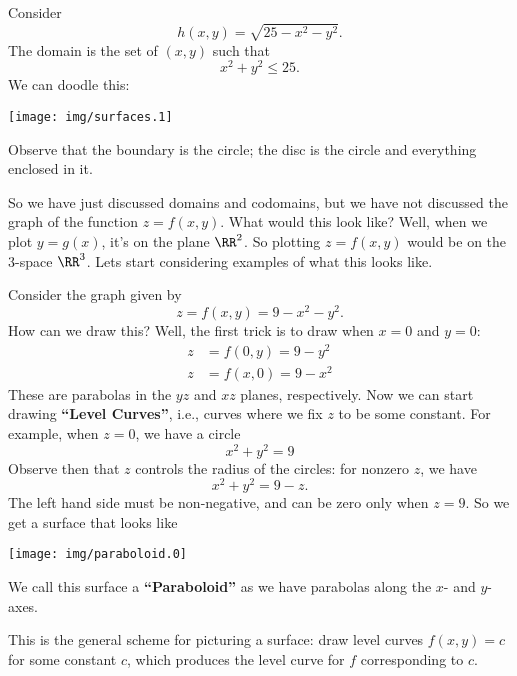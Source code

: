 \begin{example}
Consider 
\begin{equation}
h(x,y)=\sqrt{25-x^{2}-y^{2}}.
\end{equation}
The domain is the set of $(x,y)$ such that
\begin{equation}
x^{2}+y^{2}\leq25.
\end{equation}
We can doodle this:
\begin{center}
\texttt{[image: img/surfaces.1]}
\end{center}
Observe that the boundary is the circle; the disc is the circle
and everything enclosed in it.
\end{example}

\M
So we have just discussed domains and codomains, but we have not
discussed the graph of the function $z=f(x,y)$. What would this
look like? Well, when we plot $y=g(x)$, it's on the plane
$\RR^{2}$. So plotting $z=f(x,y)$ would be on the 3-space
$\RR^{3}$. Lets start considering examples of what this looks
like. 

\begin{example}
Consider the graph given by
\begin{equation}
z = f(x,y) = 9 - x^{2}-y^{2}.
\end{equation}
How can we draw this? Well, the first trick is to draw when $x=0$
and $y=0$:
\begin{equation}
\begin{aligned}
z &= f(0,y) = 9-y^{2}\\
z &= f(x,0) = 9-x^{2}
\end{aligned}
\end{equation}
These are parabolas in the $yz$ and $xz$ planes,
respectively. Now we can start drawing \textbf{``Level Curves''},
i.e., curves where we fix $z$ to be some constant. For example,
when $z=0$, we have a circle
\begin{equation}
x^{2}+y^{2}=9
\end{equation}
Observe then that $z$ controls the radius of the circles: for
nonzero $z$, we have
\begin{equation}
x^{2}+y^{2}=9-z.
\end{equation}
The left hand side must be non-negative, and can be zero only
when $z=9$. So we get a surface that looks like
\begin{center}
 \texttt{[image: img/paraboloid.0]}
\end{center}
We call this surface a \textbf{``Paraboloid''} as we have
parabolas along the $x$- and $y$-axes.

This is the general scheme for picturing a surface: draw level
curves $f(x,y)=c$ for some constant $c$, which produces the level
curve for $f$ corresponding to $c$.
\end{example}

